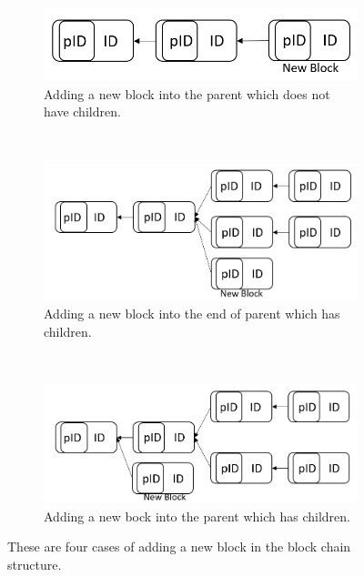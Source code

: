\documentclass[runningheads,a4paper]{llncs}
\begin{document}
\begin{figure}[!htbp]
	\centering
	\begin{subfigure}[b]{0.6\textwidth}
		\includegraphics[scale = 0.3]{image/BC2Par}
		\caption{Adding a new block into the parent which does not have children.}
	\end{subfigure}	
	\\
	\begin{subfigure}[b]{0.6\textwidth}
		\includegraphics[scale = 0.3]{image/addB2Par3}
		\caption{Adding a new block into the end of parent which has children.}
	\end{subfigure}
	\\
	\begin{subfigure}[b]{0.6\textwidth}
		\includegraphics[scale = 0.3]{image/addB2Par2}
		\caption{Adding a new bock into the parent which has children.}
	\end{subfigure}	

	\caption{These are four cases of adding a new block in the block chain structure.}
	\label{addingBlock}
\end{figure}
\end{document}

